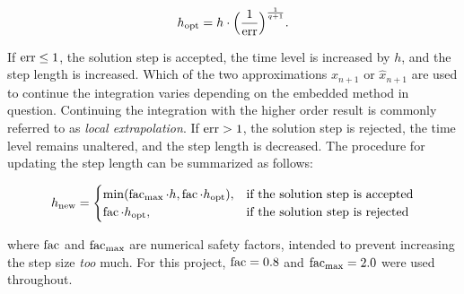\begin{equation}
    \label{eq:embeddedoptimalstepsize}
    h_{\mathrm{opt}}=h\cdot\Big(\frac{1}{\operatorname{err}}\Big)^{\frac{1}{q+1}}.
\end{equation}

If $\operatorname{err}\leq1$, the solution step is accepted, the time level is increased by
$h$, and the step length is increased. Which of the two approximations $x_{n+1}$
or $\widehat{x}_{n+1}$ are used to continue the integration varies depending on the embedded method in
question. Continuing the integration with the higher order result is commonly
referred to as \emph{local extrapolation}. If $\operatorname{err}>1$, the solution step is
rejected, the time level remains unaltered, and the step length is decreased.
The  procedure for updating the step length can be summarized as follows:


\begin{equation}
    \label{eq:embeddedstepsizeadjustment}
h_{\mathrm{new}}=\begin{cases}%
    \min(\facem_{\mathrm{max}}\cdot{}h,\facem\cdot{}h_{\mathrm{opt}}),&
\textnormal{if the solution step is accepted}\\
\facem\cdot{}h_{\mathrm{opt}},&\textnormal{if the solution step is rejected}%
\end{cases}
\end{equation}

where $\operatorname{fac}$ and $\operatorname{fac}_{\mathrm{max}}$ are numerical safety factors,
intended to prevent increasing the step size \emph{too} much. For this project,
$\operatorname{fac}=0.8$ and $\operatorname{fac}_{\mathrm{max}}=2.0$ were used throughout.

